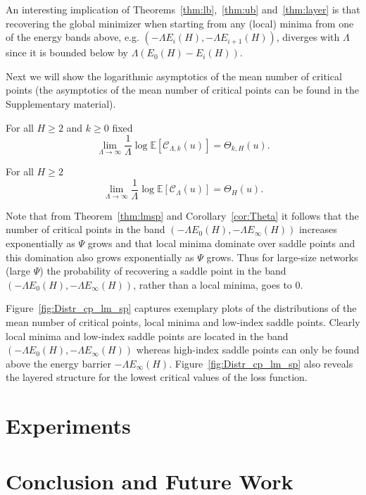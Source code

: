 \documentclass[twoside]{article}
\begin{document}
An interesting implication of Theorems~\ref{thm:lb},~\ref{thm:ub} and~\ref{thm:layer} is that recovering the global minimizer when starting from any (local) minima from one of the energy bands above, e.g. $\left(-\Lambda E_i(H),-\Lambda E_{i+1}(H)\right)$, diverges with $\Lambda$ since it is bounded below by $\Lambda (E_0(H) - E_i(H))$. 

Next we will show the logarithmic asymptotics of the mean number of critical points (the asymptotics of the mean number of critical points can be found in the Supplementary material).
\begin{theorem}
For all $H \geq 2$ and $k \geq 0$ fixed
\[\lim_{\Lambda \rightarrow \infty}\frac{1}{\Lambda}\log\mathbb{E}[\mathcal{C}_{\Lambda,k}(u)] = \Theta_{k,H}(u).
\]
\label{thm:lmsp}
\end{theorem}
\begin{theorem}
For all $H \geq 2$
\[\lim_{\Lambda \rightarrow \infty}\frac{1}{\Lambda}\log\mathbb{E}[\mathcal{C}_{\Lambda}(u)] = \Theta_{H}(u).
\]
\label{thm:cp}
\end{theorem}
Note that from Theorem~\ref{thm:lmsp} and Corollary~\ref{cor:Theta} it follows that the number of critical points in the band $\left(-\Lambda E_0(H),-\Lambda E_{\infty}(H)\right)$ increases exponentially as $\Psi$ grows and that local minima dominate over saddle points and this domination also grows exponentially as $\Psi$ grows. Thus for large-size networks (large $\Psi$) the probability of recovering a saddle point in the band $\left(-\Lambda E_0(H),-\Lambda E_{\infty}(H)\right)$, rather than a local minima, goes to $0$.

Figure~\ref{fig:Distr_cp_lm_sp} captures exemplary plots of the distributions of the mean number of critical points, local minima and low-index saddle points. Clearly local minima and low-index saddle points are located in the band $\left(-\Lambda E_0(H),-\Lambda E_{\infty}(H)\right)$ whereas high-index saddle points can only be found above the energy barrier $-\Lambda E_{\infty}(H)$. Figure~\ref{fig:Distr_cp_lm_sp} also reveals the layered structure for the lowest critical values of the loss function. 

\section{Experiments}
\label{sec:Experiments}

\section{Conclusion and Future Work}
\label{sec:ConandFutWork}
\end{document}
